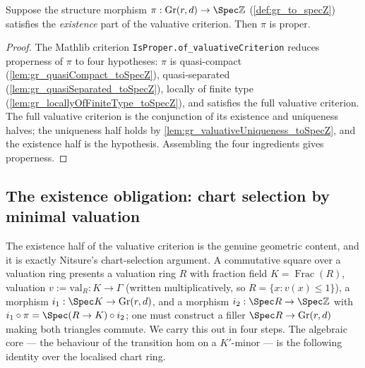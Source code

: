 \begin{lemma}\leanok
  \label{lem:gr_isProper_of_valuativeExistence}
  Suppose the structure morphism \(\pi : \mathrm{Gr}(r,d) \to \Spec \mathbb{Z}\)
  (\cref{def:gr_to_specZ}) satisfies the \emph{existence} part of the valuative
  criterion. Then \(\pi\) is proper.
\end{lemma}
\begin{proof}
    \leanok
  The Mathlib criterion \texttt{IsProper.of\_valuativeCriterion} reduces properness
  of \(\pi\) to four hypotheses: \(\pi\) is quasi-compact
  (\cref{lem:gr_quasiCompact_toSpecZ}), quasi-separated
  (\cref{lem:gr_quasiSeparated_toSpecZ}), locally of finite type
  (\cref{lem:gr_locallyOfFiniteType_toSpecZ}), and satisfies the full valuative
  criterion. The full valuative criterion is the conjunction of its existence and
  uniqueness halves; the uniqueness half holds by
  \cref{lem:gr_valuativeUniqueness_toSpecZ}, and the existence half is the
  hypothesis. Assembling the four ingredients gives properness.
\end{proof}

\subsection*{The existence obligation: chart selection by minimal valuation}

The existence half of the valuative criterion is the genuine geometric content,
and it is exactly Nitsure's chart-selection argument. A commutative square over a
valuation ring presents a valuation ring \(R\) with fraction field \(K =
\operatorname{Frac}(R)\), valuation \(v := \mathrm{val}_R : K \to \Gamma\) (written
multiplicatively, so \(R = \{x : v(x) \le 1\}\)), a morphism \(i_1 : \Spec K \to
\mathrm{Gr}(r,d)\), and a morphism \(i_2 : \Spec R \to \Spec \mathbb{Z}\) with
\(i_1 \circ \pi = \Spec(R \to K) \circ i_2\); one must construct a filler
\(\Spec R \to \mathrm{Gr}(r,d)\) making both triangles commute. We carry this out
in four steps. The algebraic core --- the behaviour of the transition hom on a
\(K'\)-minor --- is the following identity over the localised chart ring.

